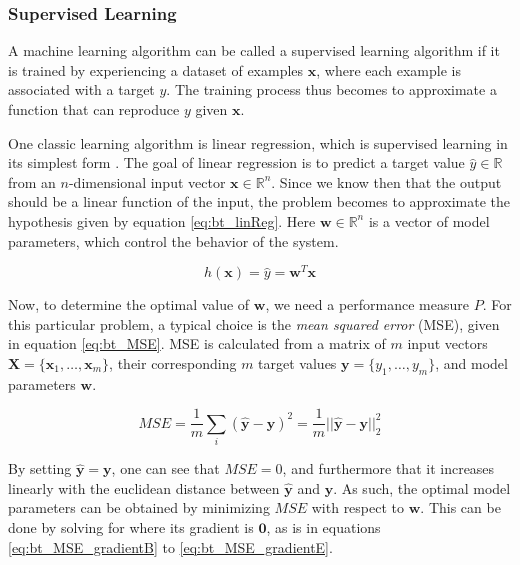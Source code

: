 \subsubsection{Supervised Learning}

A machine learning algorithm can be called a supervised learning algorithm if it is trained by experiencing a dataset of examples $\bm{x}$, where each example is associated with a target $y$. The training process thus becomes to approximate a function that can reproduce $y$ given $\bm{x}$.

One classic learning algorithm is linear regression, which is supervised learning in its simplest form \cite{goodfellow2016}. The goal of linear regression is to predict a target value $\hat{y}\in\mathbb{R}$ from an $n$-dimensional input vector $\bm{x}\in\mathbb{R}^n$. Since we know then that the output should be a linear function of the input, the problem becomes to approximate the hypothesis given by equation \ref{eq:bt_linReg}. Here $\bm{w}\in\mathbb{R}^n$ is a vector of model parameters, which control the behavior of the system.

\begin{equation}
    \label{eq:bt_linReg}
    h(\bm{x})=\hat{y}=\bm{w}^T\bm{x}
\end{equation}

Now, to determine the optimal value of $\bm{w}$, we need a performance measure $P$. For this particular problem, a typical choice is the \textit{mean squared error} (MSE), given in equation \ref{eq:bt_MSE}. MSE is calculated from a matrix of $m$ input vectors $\bm{X}=\{\bm{x}_1,\dots,\bm{x}_m\}$, their corresponding $m$ target values $\bm{y}=\{y_1,\dots,y_m\}$, and model parameters $\bm{w}$.

\begin{equation}
    \label{eq:bt_MSE}
    MSE=\frac{1}{m}\sum_{i}(\hat{\bm{y}}-\bm{y})^2
    =\frac{1}{m}||\hat{\bm{y}}-\bm{y}||^2_2
\end{equation}

By setting $\hat{\bm{y}}=\bm{y}$, one can see that $MSE=0$, and furthermore that it increases linearly with the euclidean distance between $\hat{\bm{y}}$ and $\bm{y}$. As such, the optimal model parameters can be obtained by minimizing $MSE$ with respect to $\bm{w}$. This can be done by solving for where its gradient is $\bm{0}$, as is in equations \ref{eq:bt_MSE_gradientB} to \ref{eq:bt_MSE_gradientE}.

